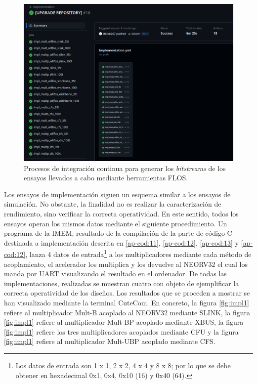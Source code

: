 \begin{figure}[H]
    \centering
    \includegraphics[width=14cm]{Figuras/impl-gh.png}
    \caption{Procesos de integración continua para generar los \textit{bitstreams} de los ensayos llevados a cabo mediante herramientas FLOS.}
    \label{fig:impl-gh}
\end{figure}

Los ensayos de implementación siguen un esquema similar a los ensayos de simulación.
No obstante, la finalidad no es realizar la caracterización de rendimiento, sino verificar la correcta operatividad.
En este sentido, todos los ensayos operan los mismos datos mediante el siguiente procedimiento.
Un programa de la IMEM, resultado de la compilación de la parte de código C destinada a implementación descrita en \ref{ap-cod:11}, \ref{ap-cod:12}, \ref{ap-cod:13} y \ref{ap-cod:12}, lanza 4 datos de entrada\footnote{Los datos de entrada son 1 x 1, 2 x 2, 4 x 4 y 8 x 8; por lo que se debe obtener en hexadecimal 0x1, 0x4, 0x10 (16) y 0x40 (64).} a los multiplicadores mediante cada método de acoplamiento, el acelerador los multiplica y los devuelve al NEORV32 el cual los manda por UART visualizando el resultado en el ordenador.
De todas las implementaciones, realizadas se muestran cuatro con objeto de ejemplificar la correcta operatividad de los diseños.
Los resultados que se proceden a mostrar se han visualizado mediante la terminal CuteCom.
En concreto, la figura \ref{fig:impl1} refiere al multiplicador Mult-B acoplado al NEORV32 mediante SLINK, la figura \ref{fig:impl1} refiere al multiplicador Mult-BP acoplado mediante XBUS, la figura \ref{fig:impl1} refiere los tres multiplicadores acoplados mediante CFU y la figura \ref{fig:impl1} refiere al multiplicador Mult-UBP acoplado mediante CFS.


